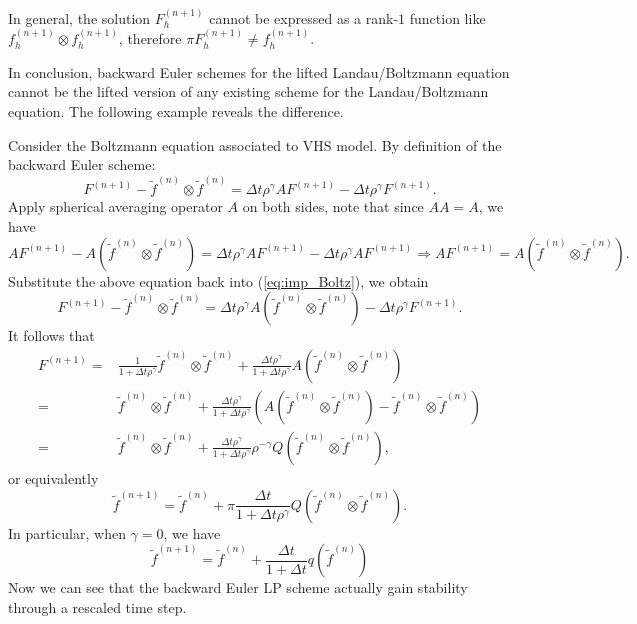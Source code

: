 \documentclass{article}
\numberwithin{equation}{section}
\begin{document}
In general, the solution $F^{(n+1)}_{h}$ cannot be expressed as a rank-$1$ function like $f^{(n+1)}_{h} \otimes f^{(n+1)}_{h}$, therefore $\pi F_{h}^{(n+1)} \neq f_{h}^{(n+1)}$.

In conclusion, backward Euler schemes for the lifted Landau/Boltzmann equation cannot be the lifted version of any existing scheme for the Landau/Boltzmann equation. The following example reveals the difference.


\bigskip
Consider the Boltzmann equation associated to VHS model. By definition of the backward Euler scheme:
    \begin{equation}\label{eq:imp_Boltz}
        F^{(n+1)} - \widetilde{f}^{(n)}\otimes \widetilde{f}^{(n)} = \Delta t \rho^{\gamma} AF^{(n+1)} - \Delta t \rho^{\gamma} F^{(n+1)}.
    \end{equation}
Apply spherical averaging operator $A$ on both sides, note that since $AA = A$, we have
    \begin{equation*}
        AF^{(n+1)} - A\left(\widetilde{f}^{(n)}\otimes \widetilde{f}^{(n)}\right) = \Delta t\rho^{\gamma} AF^{(n+1)} - \Delta t \rho^{\gamma}AF^{(n+1)} \Rightarrow AF^{(n+1)} = A\left(\widetilde{f}^{(n)}\otimes \widetilde{f}^{(n)}\right).
    \end{equation*}
Substitute the above equation back into (\ref{eq:imp_Boltz}), we obtain
    \begin{equation*}
        F^{(n+1)} - \widetilde{f}^{(n)}\otimes \widetilde{f}^{(n)} = \Delta t\rho^{\gamma} A\left(\widetilde{f}^{(n)}\otimes \widetilde{f}^{(n)}\right) - \Delta t\rho^{\gamma} F^{(n+1)}.
    \end{equation*}
It follows that
    \begin{equation*}
        \begin{split}
            F^{(n+1)} =& \frac{1}{1+\Delta t\rho^{\gamma}}\widetilde{f}^{(n)}\otimes \widetilde{f}^{(n)} + \frac{\Delta t\rho^{\gamma}}{1+\Delta t\rho^{\gamma}}A\left(\widetilde{f}^{(n)}\otimes \widetilde{f}^{(n)}\right)\\
            =&\widetilde{f}^{(n)}\otimes \widetilde{f}^{(n)} + \frac{\Delta t\rho^{\gamma}}{1+\Delta t\rho^{\gamma}}\left(A\left(\widetilde{f}^{(n)}\otimes \widetilde{f}^{(n)}\right)-\widetilde{f}^{(n)}\otimes \widetilde{f}^{(n)}\right)\\
            =&\widetilde{f}^{(n)}\otimes \widetilde{f}^{(n)} + \frac{\Delta t\rho^{\gamma}}{1+\Delta t\rho^{\gamma}}\rho^{-\gamma}Q\left(\widetilde{f}^{(n)}\otimes \widetilde{f}^{(n)}\right),
        \end{split}
    \end{equation*}
or equivalently 
    \begin{equation*}
        \widetilde{f}^{(n+1)} = \widetilde{f}^{(n)} +\pi \frac{\Delta t}{1+\Delta t\rho^{\gamma}}Q\left(\widetilde{f}^{(n)}\otimes \widetilde{f}^{(n)}\right).
    \end{equation*}
In particular, when $\gamma = 0$, we have
\begin{equation*}
    \widetilde{f}^{(n+1)} = \widetilde{f}^{(n)} +\frac{\Delta t}{1+\Delta t}q\left(\widetilde{f}^{(n)}\right)
\end{equation*}
Now we can see that the backward Euler LP scheme actually gain stability through a rescaled time step.
\end{document}
